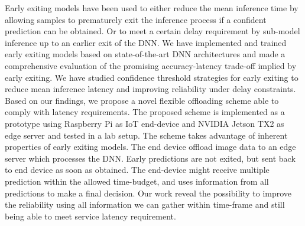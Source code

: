 {{    \newline\noindent Early exiting models have been used to either reduce the mean inference time by allowing samples to prematurely exit the inference process if a confident prediction can be obtained. Or to meet a certain delay requirement by sub-model inference up to an earlier exit of the DNN. We have implemented and trained early exiting models based on state-of-the-art DNN architectures and made a comprehensive evaluation of the promising accuracy-latency trade-off implied by early exiting. We have studied confidence threshold strategies for early exiting to reduce mean inference latency and improving reliability under delay constraints. Based on our findings, we propose a novel flexible offloading scheme able to comply with latency requirements. The proposed scheme is implemented as a prototype using Raspberry Pi as IoT end-device and NVIDIA Jetson TX2 as edge server and tested in a lab setup. The scheme takes advantage of inherent properties of early exiting models. The end device offload image data to an edge server which processes the DNN. Early predictions are not exited, but sent back to end device as soon as obtained. The end-device might receive multiple prediction within the allowed time-budget, and uses information from all predictions to make a final decision. Our work reveal the possibility to improve the reliability using all information we can gather within time-frame and still being able to meet service latency requirement. }}